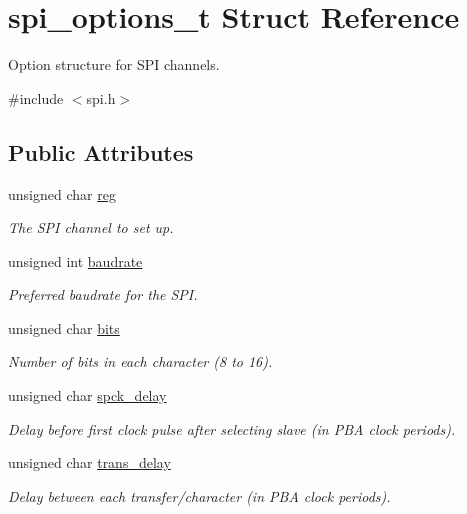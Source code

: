 \hypertarget{structspi__options__t}{}\section{spi\+\_\+options\+\_\+t Struct Reference}
\label{structspi__options__t}


Option structure for S\+P\+I channels.  




{\ttfamily \#include $<$spi.\+h$>$}

\subsection*{Public Attributes}
\begin{DoxyCompactItemize}
\item 
unsigned char \hyperlink{structspi__options__t_a1e6dfa9b370d7e4f0b4e8d6cb75835a5}{reg}
\begin{DoxyCompactList}\small\item\em The S\+P\+I channel to set up. \end{DoxyCompactList}\item 
unsigned int \hyperlink{structspi__options__t_a68bf86b07a5c69d257ae8d4a9c307b9e}{baudrate}
\begin{DoxyCompactList}\small\item\em Preferred baudrate for the S\+P\+I. \end{DoxyCompactList}\item 
unsigned char \hyperlink{structspi__options__t_afdd53dbfebb4b94e95fa18a8e3037c65}{bits}
\begin{DoxyCompactList}\small\item\em Number of bits in each character (8 to 16). \end{DoxyCompactList}\item 
unsigned char \hyperlink{structspi__options__t_aa9434f07d440208f42f817cb977f6a52}{spck\+\_\+delay}
\begin{DoxyCompactList}\small\item\em Delay before first clock pulse after selecting slave (in P\+B\+A clock periods). \end{DoxyCompactList}\item 
unsigned char \hyperlink{structspi__options__t_aee521fc57eda6597539edb8d4dff56eb}{trans\+\_\+delay}
\begin{DoxyCompactList}\small\item\em Delay between each transfer/character (in P\+B\+A clock periods). \end{DoxyCompactList}\item 

\end{DoxyCompactItemize}
